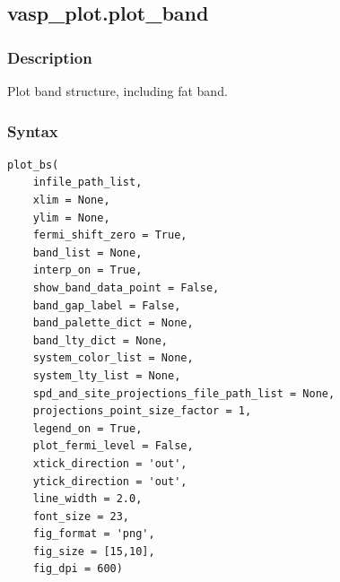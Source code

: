 \documentclass[12pt]{book}
\begin{document}
\subsection{vasp\_plot.plot\_band}
\subsubsection{Description}
Plot band structure, including fat band.
\subsubsection{Syntax}
\begin{lstlisting}
plot_bs(
    infile_path_list, 
    xlim = None, 
    ylim = None, 
    fermi_shift_zero = True, 
    band_list = None,
    interp_on = True, 
    show_band_data_point = False,
    band_gap_label = False,
    band_palette_dict = None, 
    band_lty_dict = None,
    system_color_list = None, 
    system_lty_list = None,
    spd_and_site_projections_file_path_list = None, 
    projections_point_size_factor = 1,
    legend_on = True, 
    plot_fermi_level = False,
    xtick_direction = 'out', 
    ytick_direction = 'out',
    line_width = 2.0, 
    font_size = 23, 
    fig_format = 'png', 
    fig_size = [15,10], 
    fig_dpi = 600)
\end{lstlisting}
\end{document}
